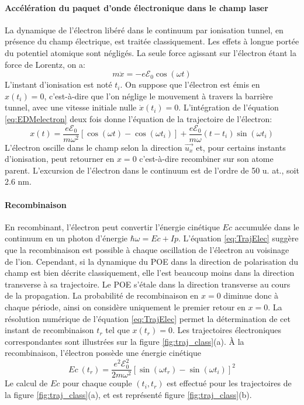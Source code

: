 \paragraph{Accélération du paquet d'onde électronique dans le champ laser} La dynamique de l'électron libéré dans le continuum par ionisation tunnel, en présence du champ électrique, est traitée classiquement. Les effets à longue portée du potentiel atomique sont négligés. La seule force agissant sur l'électron étant la force de Lorentz, on a:
\begin{equation}
m \ddot{x} = -e \mathcal{E}_0 \cos(\omega t)
\label{eq:EDMelectron}
\end{equation} 
L'instant d'ionisation est noté $t_i$. On suppose que l'électron est émis en $x(t_i) = 0$, c'est-à-dire que l'on néglige le mouvement à travers la barrière tunnel, avec une vitesse initiale nulle $\dot{x}(t_i) = 0$. L'intégration de l'équation \ref{eq:EDMelectron} deux fois donne l'équation de la trajectoire de l'électron:
\begin{equation}
x(t) = \frac{e \mathcal{E}_0}{m \omega^2} \left[ \cos(\omega t) - \cos(\omega t_i) \right] + \frac{e \mathcal{E}_0}{m \omega}(t-t_i) \sin(\omega t_i)
\label{eq:TrajElec}
\end{equation}
L'électron oscille dans le champ selon la direction $\vec{u_x}$ et, pour certains instants d'ionisation, peut retourner en $x = 0$ c'est-à-dire recombiner sur son atome parent. L'excursion de l'électron dans le continuum est de l'ordre de 50 u. at., soit 2.6 nm.

\paragraph{Recombinaison} En recombinant, l'électron peut convertir l'énergie cinétique $Ec$ accumulée dans le continuum en un photon d'énergie $\hbar \omega = Ec + Ip$. L'équation \ref{eq:TrajElec} suggère que la recombinaison est possible à chaque oscillation de l'électron au voisinage de l'ion. Cependant, si la dynamique du POE dans la direction de polarisation du champ est bien décrite classiquement, elle l'est beaucoup moins dans la direction transverse à sa trajectoire. Le POE s'étale dans la direction transverse au cours de la propagation. La probabilité de recombinaison en $x = 0$ diminue donc à chaque période, ainsi on considère uniquement le premier retour en $x = 0$. La résolution numérique de l'équation \ref{eq:TrajElec} permet la détermination de cet instant de recombinaison $t_r$ tel que $x(t_r) = 0$. Les trajectoires électroniques correspondantes sont illustrées sur la figure \ref{fig:traj_class}(a). \`{A} la recombinaison, l'électron possède une énergie cinétique
\begin{equation}
Ec \: (t_r) = \frac{e^2 \mathcal{E}_0^2}{2m\omega^2} \left[ \sin(\omega t_r) - \sin(\omega t_i) \right]^2
\end{equation}
Le calcul de $Ec$ pour chaque couple $(t_i, t_r)$ est effectué pour les trajectoires de la figure \ref{fig:traj_class}(a), et est représenté figure \ref{fig:traj_class}(b). 

